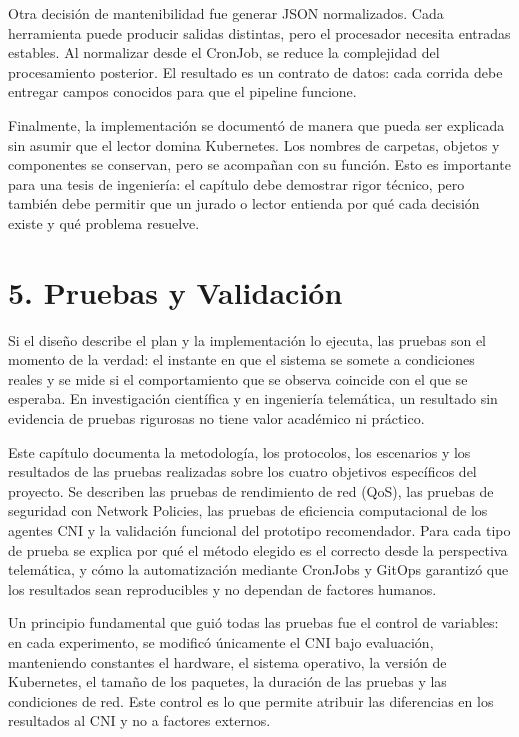 \documentclass[journal]{IEEEtran}
\begin{document}
Otra decisión de mantenibilidad fue generar JSON normalizados. Cada herramienta puede producir salidas distintas, pero el procesador necesita entradas estables. Al normalizar desde el CronJob, se reduce la complejidad del procesamiento posterior. El resultado es un contrato de datos: cada corrida debe entregar campos conocidos para que el pipeline funcione.

Finalmente, la implementación se documentó de manera que pueda ser explicada sin asumir que el lector domina Kubernetes. Los nombres de carpetas, objetos y componentes se conservan, pero se acompañan con su función. Esto es importante para una tesis de ingeniería: el capítulo debe demostrar rigor técnico, pero también debe permitir que un jurado o lector entienda por qué cada decisión existe y qué problema resuelve.


\section{5. Pruebas y Validación}

Si el diseño describe el plan y la implementación lo ejecuta, las pruebas son el momento de la verdad: el instante en que el sistema se somete a condiciones reales y se mide si el comportamiento que se observa coincide con el que se esperaba. En investigación científica y en ingeniería telemática, un resultado sin evidencia de pruebas rigurosas no tiene valor académico ni práctico.

Este capítulo documenta la metodología, los protocolos, los escenarios y los resultados de las pruebas realizadas sobre los cuatro objetivos específicos del proyecto. Se describen las pruebas de rendimiento de red (QoS), las pruebas de seguridad con Network Policies, las pruebas de eficiencia computacional de los agentes CNI y la validación funcional del prototipo recomendador. Para cada tipo de prueba se explica por qué el método elegido es el correcto desde la perspectiva telemática, y cómo la automatización mediante CronJobs y GitOps garantizó que los resultados sean reproducibles y no dependan de factores humanos.

Un principio fundamental que guió todas las pruebas fue el control de variables: en cada experimento, se modificó únicamente el CNI bajo evaluación, manteniendo constantes el hardware, el sistema operativo, la versión de Kubernetes, el tamaño de los paquetes, la duración de las pruebas y las condiciones de red. Este control es lo que permite atribuir las diferencias en los resultados al CNI y no a factores externos.
\end{document}
